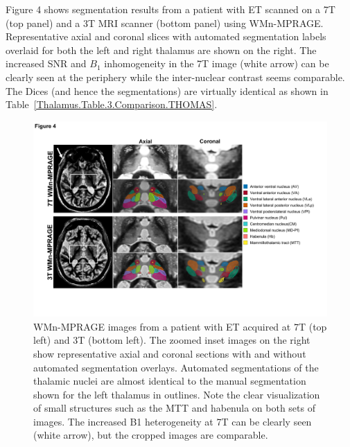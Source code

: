 Figure 4 shows segmentation results from a patient with ET scanned on a 7T (top panel) and a 3T MRI scanner (bottom panel) using WMn-MPRAGE. Representative axial and coronal slices with automated segmentation labels overlaid for both the left and right thalamus are shown on the right. The increased SNR and $B_1$ inhomogeneity in the 7T image (white arrow) can be clearly seen at the periphery while the inter-nuclear contrast seems comparable. The Dices (and hence the segmentations) are virtually identical as shown in Table~\ref{Thalamus.Table.3.Comparison.THOMAS}.

\begin{figure}[!htbp]
\centering \includegraphics[width=\textwidth]{figures/pdf/slide4.pdf}
\caption{WMn-MPRAGE images from a patient with ET acquired at 7T (top left) and 3T (bottom left). The zoomed inset images on the right show representative axial and coronal sections with and without automated segmentation overlays. Automated segmentations of the thalamic nuclei are almost identical to the manual segmentation shown for the left thalamus in outlines. Note the clear visualization of small structures such as the MTT and habenula on both sets of images. The increased B1 heterogeneity at 7T can be clearly seen (white arrow), but the cropped images are comparable.}\label{Thalamus.Fig.2.MultiPlanar.ET}
\end{figure}



